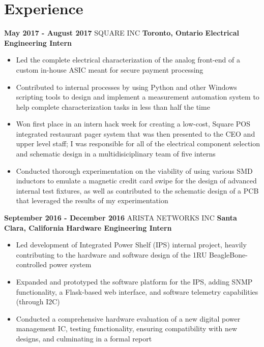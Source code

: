 \documentclass[hidelinks]{kkurucz-cv}
\begin{document}
\vspace{-4.5mm}
\begin{minipage}{\textwidth}
\section{Experience}

\vspace{1mm}
\begin{entrylist}
\entry
{\textbf{May 2017 - August 2017}}
{SQUARE INC}
{\textbf{Toronto, Ontario}}
{\textbf{Electrical Engineering Intern}}
{
\begin{itemize}
	\item Led the complete electrical characterization of the analog front-end of a custom in-house ASIC meant for secure payment processing
	\item Contributed to internal processes by using Python and other Windows scripting tools to design and implement a measurement automation system to help complete characterization tasks in less than half the time
	\item Won first place in an intern hack week for creating a low-cost, Square POS integrated restaurant pager system that was then presented to the CEO and upper level staff; I was responsible for all of the electrical component selection and schematic design in a multidisiciplinary team of five interns
	\item Conducted thorough experimentation on the viability of using various SMD inductors to emulate a magnetic credit card swipe for the design of advanced internal test fixtures, as well as contributed to the schematic design of a PCB that leveraged the results of my experimentation
\end{itemize}
}

\entry
{\textbf{September 2016 - December 2016}}
{ARISTA NETWORKS INC}
{\textbf{Santa Clara, California}}
{\textbf{Hardware Engineering Intern}}
{
\begin{itemize}
	\item Led development of Integrated Power Shelf (IPS) internal project, heavily contributing to the hardware and software design of the 1RU BeagleBone-controlled power system
	\item Expanded and prototyped the software platform for the IPS, adding SNMP functionality, a Flask-based web interface, and software telemetry capabilities (through I2C)
	\item Conducted a comprehensive hardware evaluation of a new digital power management IC, testing functionality, ensuring compatibility with new designs, and culminating in a formal report
\end{itemize}
}


\end{entrylist}
\end{minipage}
\end{document}
